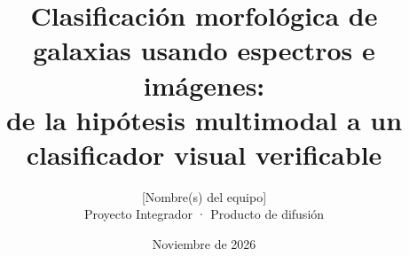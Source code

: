 \documentclass[11pt,a4paper]{article}
\usepackage[utf8]{inputenc}
\usepackage[T1]{fontenc}
\usepackage{lmodern}
\usepackage[margin=2.5cm]{geometry}
\usepackage{amsmath,amssymb}
\usepackage{graphicx}
\usepackage{booktabs}
\usepackage{tabularx}
\usepackage{xcolor}
\usepackage{microtype}
\usepackage{fancyhdr}
\usepackage[round,authoryear]{natbib}
\usepackage[colorlinks=true,linkcolor=teal,citecolor=teal,urlcolor=teal]{hyperref}

\renewcommand{\figurename}{Figura}
\renewcommand{\tablename}{Tabla}
\renewcommand{\refname}{Referencias}
\renewcommand{\abstractname}{Resumen}
\renewcommand{\contentsname}{Contenido}
\renewcommand{\appendixname}{Anexo}

\pagestyle{fancy}
\fancyhf{}
\fancyfoot[C]{\thepage}
\setlength{\headheight}{14pt}
\setlength{\parskip}{3pt}

\title{\textbf{Clasificación morfológica de galaxias usando espectros e imágenes:\\ de la hipótesis multimodal a un clasificador visual verificable}}
\author{[Nombre(s) del equipo] \\ \small Proyecto Integrador · Producto de difusión}
\date{Noviembre de 2026}


\maketitle
\thispagestyle{fancy}

